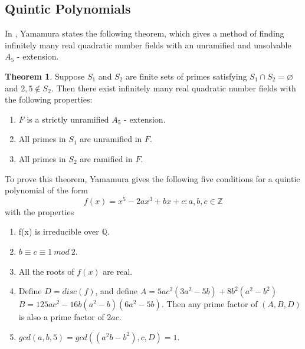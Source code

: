 \documentclass[12pt]{extarticle}
\newcommand{\Q}{\mathbb{Q}}
\newcommand{\Z}{\mathbb{Z}}
\newcommand{\<}{\langle}
\renewcommand{\>}{\rangle}
\renewcommand{\emptyset}{\varnothing}
\theoremstyle{definition}
\newtheorem{theorem}{Theorem}
\begin{document}
\subsection{Quintic Polynomials}
In \cite{yamamura1986}, Yamamura states the following theorem, which gives a method of finding infinitely many real quadratic number fields with an unramified and unsolvable $A_5$ - extension. 
\begin{theorem}
    Suppose $S_1$ and $S_2$ are finite sets of primes satisfying $S_1 \cap S_2 = \emptyset$ and $2,5 \notin S_2$. Then there exist infinitely many real quadratic number fields with the following properties: \begin{enumerate}
        \item $F$ is a strictly unramified $A_5$ - extension.
        \item All primes in $S_1$ are unramified in $F$.
        \item All primes in $S_2$ are ramified in $F$.
    \end{enumerate}
\end{theorem}
To prove this theorem, Yamamura gives the following five conditions for a quintic polynomial of the form \begin{equation}
    f(x)=x^5-2ax^3+bx+c:  a,b,c \in \Z
\end{equation} with the properties
\begin{enumerate}
\item f(x) is irreducible over $\Q$.
\item $b \equiv c \equiv 1 \: mod \: 2  $.
\item All the roots of $f(x)$ are real.
\item Define $D = disc(f)$, and define
$A= 5ac^2(3a^2-5b)+8b^2(a^2-b^2)$
$B = 125ac^2-16b(a^2-b)(6a^2-5b)$.
Then any prime factor of $(A,B,D)$ is also a prime factor of $2ac$. 

\item $gcd(a,b,5) =gcd((a^2b-b^2),c,D)=1$.

\end{enumerate} 
\end{document}
